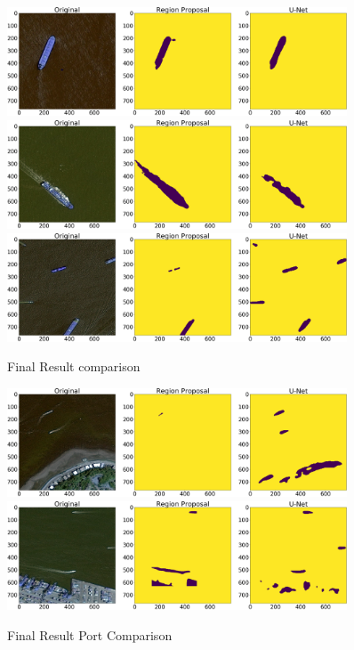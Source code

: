 \begin{figure}
	\includegraphics[width=0.9\textwidth]{Pictures/016Comparison3.png}
	\includegraphics[width=0.9\textwidth]{Pictures/016Comparison5.png}
	\includegraphics[width=0.9\textwidth]{Pictures/016Comparison6.png}
	\caption{Final Result comparison}
	\label{Final_Result}
\end{figure}

\begin{figure}
	\includegraphics[width=0.9\textwidth]{Pictures/016Comparison7.png}
	\includegraphics[width=0.9\textwidth]{Pictures/016Comparison8.png}
	\caption{Final Result Port Comparison}
	\label{Final_Result_Port}
\end{figure}